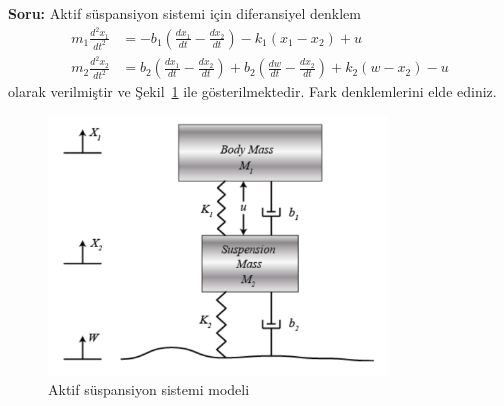 \noindent\textbf{Soru:} Aktif süspansiyon sistemi için diferansiyel denklem 
\begin{equation}
\begin{split}
    m_1\frac{d^2x_1}{dt^2}&=-b_1\left(\frac{dx_1}{dt}-\frac{dx_2}{dt}\right)-k_1(x_1-x_2)+u\\
    m_2\frac{d^2x_2}{dt^2}&=b_2\left(\frac{dx_1}{dt}-\frac{dx_2}{dt}\right)+b_2\left(\frac{dw}{dt}-\frac{dx_2}{dt}\right)+k_2(w-x_2)-u
\end{split}
\end{equation}
olarak verilmiştir ve Şekil~\ref{fig:suspension} ile gösterilmektedir. Fark denklemlerini elde ediniz.
\begin{figure}[!htb]
    \centering
    \includegraphics[width=0.8\textwidth]{suspension}
    \caption{Aktif süspansiyon sistemi modeli}\label{fig:suspension}
\end{figure}

